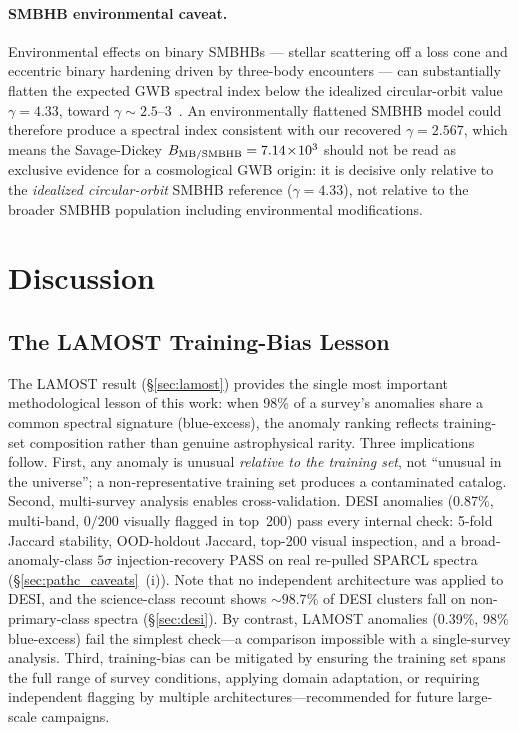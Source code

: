 \documentclass[aps,prd,twocolumn,superscriptaddress,showpacs,preprintnumbers,nofootinbib,longbibliography,floatfix]{revtex4-2}
\begin{document}
\paragraph{SMBHB environmental caveat.}
Environmental effects on binary SMBHBs --- stellar scattering off a loss cone and eccentric binary hardening driven by three-body encounters --- can substantially flatten the expected GWB spectral index below the idealized circular-orbit value $\gamma = 4.33$, toward $\gamma \sim 2.5$--$3$~\cite{Sesana2016,Burke-Spolaor2019}. An environmentally flattened SMBHB model could therefore produce a spectral index consistent with our recovered $\gamma = 2.567$, which means the Savage-Dickey $B_{\rm MB/SMBHB} = 7.14\!\times\!10^3$ should not be read as exclusive evidence for a cosmological GWB origin: it is decisive only relative to the \emph{idealized circular-orbit} SMBHB reference ($\gamma = 4.33$), not relative to the broader SMBHB population including environmental modifications.

\section{Discussion}\label{sec:discussion}

\subsection{The LAMOST Training-Bias Lesson}\label{sec:lamost_lesson}

The LAMOST result (\S\ref{sec:lamost}) provides the single most important methodological lesson of this work: when 98\% of a survey's anomalies share a common spectral signature (blue-excess), the anomaly ranking reflects training-set composition rather than genuine astrophysical rarity. Three implications follow. First, any anomaly is unusual \emph{relative to the training set}, not ``unusual in the universe''; a non-representative training set produces a contaminated catalog. Second, multi-survey analysis enables cross-validation. DESI anomalies (0.87\%, multi-band, $0/200$ visually flagged in top~200) pass every internal check: 5-fold Jaccard stability, OOD-holdout Jaccard, top-200 visual inspection, and a broad-anomaly-class $5\sigma$ injection-recovery PASS on real re-pulled SPARCL spectra (\S\ref{sec:pathc_caveats}~(i)). Note that no independent architecture was applied to DESI, and the science-class recount shows ${\sim}98.7\%$ of DESI clusters fall on non-primary-class spectra (\S\ref{sec:desi}). By contrast, LAMOST anomalies (0.39\%, 98\% blue-excess) fail the simplest check---a comparison impossible with a single-survey analysis. Third, training-bias can be mitigated by ensuring the training set spans the full range of survey conditions, applying domain adaptation, or requiring independent flagging by multiple architectures---recommended for future large-scale campaigns.
\end{document}
